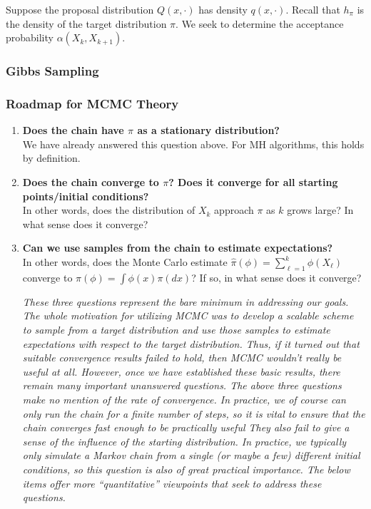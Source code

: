\documentclass[12pt]{article}
\begin{document}
Suppose the proposal distribution $Q(x, \cdot)$ has density $q(x, \cdot)$. Recall that $h_\pi$ is the density of the target distribution $\pi$. We seek to determine the acceptance probability $\alpha(X_k, X_{k + 1})$. 

\subsubsection{Gibbs Sampling}

\subsubsection{Roadmap for MCMC Theory}
\begin{enumerate}
\item \textbf{Does the chain have $\pi$ as a stationary distribution?} \\
We have already answered this question above. For MH algorithms, this holds by definition. 

\item \textbf{Does the chain converge to $\pi$? Does it converge for all starting points/initial conditions?} \\
In other words, does the distribution of $X_k$ approach $\pi$ as $k$ grows large? In what sense does it converge? 

\item \textbf{Can we use samples from the chain to estimate expectations?} \\
In other words, does the Monte Carlo estimate $\hat{\pi}(\phi) = \sum_{\ell = 1}^{k} \phi(X_\ell)$ converge to $\pi(\phi) = \int \phi(x) \pi(dx)$? If so, in what sense does it converge? 

\bigskip
\textit{These three questions represent the bare minimum in addressing our goals. The whole motivation for utilizing MCMC was to develop a scalable scheme to sample from a target distribution 
and use those samples to estimate expectations with respect to the target distribution. Thus, if it turned out that suitable convergence results failed to hold, then MCMC wouldn't really be useful 
at all. However, once we have established these basic results, there remain many important unanswered questions. The above three questions make no mention of the rate of convergence. In practice, 
we of course can only run the chain for a finite number of steps, so it is vital to ensure that the chain converges fast enough to be practically useful
They also fail to give a sense of the influence of the starting distribution. In practice, we typically only simulate a Markov chain from a single (or maybe a few) different initial conditions, so this 
question is also of great practical importance. The below items offer more ``quantitative'' viewpoints that seek to address these questions.}


\end{enumerate}
\end{document}
